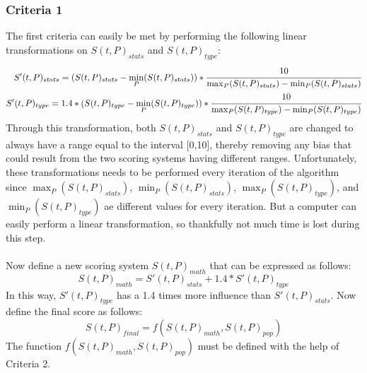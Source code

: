 \documentclass{article}
\begin{document}
\subsubsection{Criteria 1}
The first criteria can easily be met by performing the following linear transformations on $S(t,P)_{stats}$ and $S(t,P)_{type}$:
\begin{eqnarray*}
	S'(t,P)_{stats}=(S(t,P)_{stats}-\min_P(S(t,P)_{stats}))*\cfrac{10}{\max_P(S(t,P)_{stats})-\min_P(S(t,P)_{stats})}\\
	S'(t,P)_{type}=1.4*(S(t,P)_{type}-\min_P(S(t,P)_{type}))*\cfrac{10}{\max_P(S(t,P)_{type})-\min_P(S(t,P)_{type})}
\end{eqnarray*}
Through this transformation, both $S(t,P)_{stats}$ and $S(t,P)_{type}$ are changed to always have a range equal to the interval [0,10], thereby removing any bias that could result from the two scoring systems having different ranges. Unfortunately, these transformations needs to be performed every iteration of the algorithm since $\max_P(S(t,P)_{stats})$, $\min_P(S(t,P)_{stats})$, $\max_P(S(t,P)_{type})$, and $\min_P(S(t,P)_{type})$ ae different values for every iteration. But a computer can easily perform a linear transformation, so thankfully not much time is lost during this step.\\\\
Now define a new scoring system $S(t,P)_{math}$ that can be expressed as follows:
\begin{equation*}
	S(t,P)_{math}=S'(t,P)_{stats}+1.4*S'(t,P)_{type}
\end{equation*}
In this way, $S'(t,P)_{type}$ has a 1.4 times more influence than $S'(t,P)_{stats}$. 
Now define the final score as follows:
\begin{equation*}
S(t,P)_{final}=f(S(t,P)_{math},S(t,P)_{pop})
\end{equation*}
The function $f(S(t,P)_{math},S(t,P)_{pop})$ must be defined with the help of Criteria 2.
\end{document}
